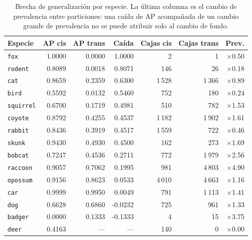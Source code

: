 \begin{table}[t]
  \centering
  \small
  \begin{tabular}{lrrrrrr}
    \toprule
    Especie & AP cis & AP trans & Caída & Cajas cis & Cajas trans & Prev. \\
    \midrule
    \texttt{fox} & 1.0000 & 0.0000 & 1.0000 & 2 & 1 & $\times$0.50 \\
    \texttt{rodent} & 0.8089 & 0.0018 & 0.8071 & 146 & 26 & $\times$0.18 \\
    \texttt{cat} & 0.8659 & 0.2359 & 0.6300 & 1\,528 & 1\,366 & $\times$0.89 \\
    \texttt{bird} & 0.5592 & 0.0132 & 0.5460 & 752 & 180 & $\times$0.24 \\
    \texttt{squirrel} & 0.6700 & 0.1719 & 0.4981 & 510 & 782 & $\times$1.53 \\
    \texttt{coyote} & 0.8792 & 0.4255 & 0.4537 & 1\,182 & 1\,902 & $\times$1.61 \\
    \texttt{rabbit} & 0.8436 & 0.3919 & 0.4517 & 1\,559 & 722 & $\times$0.46 \\
    \texttt{skunk} & 0.9430 & 0.4930 & 0.4500 & 162 & 273 & $\times$1.69 \\
    \texttt{bobcat} & 0.7247 & 0.4536 & 0.2711 & 772 & 1\,979 & $\times$2.56 \\
    \texttt{raccoon} & 0.9057 & 0.7062 & 0.1995 & 981 & 4\,803 & $\times$4.90 \\
    \texttt{opossum} & 0.9156 & 0.8623 & 0.0533 & 4\,010 & 4\,663 & $\times$1.16 \\
    \texttt{car} & 0.9999 & 0.9950 & 0.0049 & 791 & 1\,113 & $\times$1.41 \\
    \texttt{dog} & 0.6628 & 0.6860 & -0.0232 & 725 & 961 & $\times$1.33 \\
    \texttt{badger} & 0.0000 & 0.1333 & -0.1333 & 4 & 15 & $\times$3.75 \\
    \texttt{deer} & 0.4163 & --- & --- & 140 & 0 & $\times$0.00 \\
    \bottomrule
  \end{tabular}
  \caption{Brecha de generalización por especie. La última columna es el cambio de prevalencia entre particiones: una caída de AP acompañada de un cambio grande de prevalencia no se puede atribuir solo al cambio de fondo.}
  \label{tab:brechas}
\end{table}
